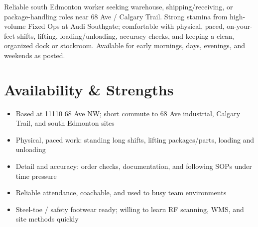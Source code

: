 \documentclass[11pt,a4paper,sans]{moderncv}
\begin{document}
\makecvtitle

\vspace{4pt}
\small{Reliable south Edmonton worker seeking warehouse, shipping/receiving, or package-handling roles near 68 Ave / Calgary Trail. Strong stamina from high-volume Fixed Ops at Audi Southgate; comfortable with physical, paced, on-your-feet shifts, lifting, loading/unloading, accuracy checks, and keeping a clean, organized dock or stockroom. Available for early mornings, days, evenings, and weekends as posted.}

\section{Availability \& Strengths}
\vspace{1pt}
\begin{itemize}
\item Based at 11110 68 Ave NW; short commute to 68 Ave industrial, Calgary Trail, and south Edmonton sites
\item Physical, paced work: standing long shifts, lifting packages/parts, loading and unloading
\item Detail and accuracy: order checks, documentation, and following SOPs under time pressure
\item Reliable attendance, coachable, and used to busy team environments
\item Steel-toe / safety footwear ready; willing to learn RF scanning, WMS, and site methods quickly
\end{itemize}
\end{document}
